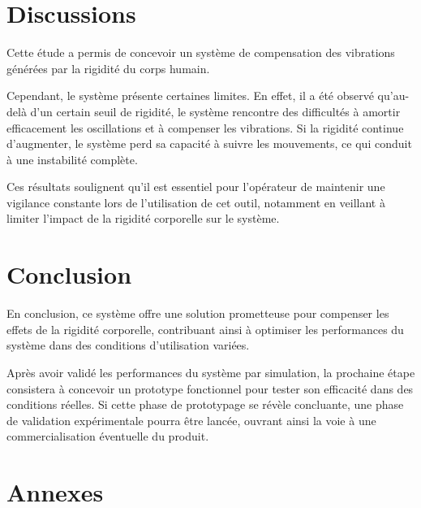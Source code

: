 \documentclass[a4paper,12pt]{article}
\begin{document}
    

    \newpage
    \section{Discussions}
    Cette étude a permis de concevoir un système de compensation des vibrations générées par la rigidité du corps humain.

    Cependant, le système présente certaines limites. En effet, il a été observé qu'au-delà d'un certain seuil de rigidité, le système rencontre des difficultés à amortir efficacement les oscillations et à compenser les vibrations. Si la rigidité continue d'augmenter, le système perd sa capacité à suivre les mouvements, ce qui conduit à une instabilité complète.

    Ces résultats soulignent qu'il est essentiel pour l'opérateur de maintenir une vigilance constante lors de l'utilisation de cet outil, notamment en veillant à limiter l'impact de la rigidité corporelle sur le système.
    
    
    \section{Conclusion}
    En conclusion, ce système offre une solution prometteuse pour compenser les effets de la rigidité corporelle, contribuant ainsi à optimiser les performances du système dans des conditions d'utilisation variées.

    Après avoir validé les performances du système par simulation, la prochaine étape consistera à concevoir un prototype fonctionnel pour tester son efficacité dans des conditions réelles. Si cette phase de prototypage se révèle concluante, une phase de validation expérimentale pourra être lancée, ouvrant ainsi la voie à une commercialisation éventuelle du produit.



    \newpage
    \section{Annexes}
\end{document}
